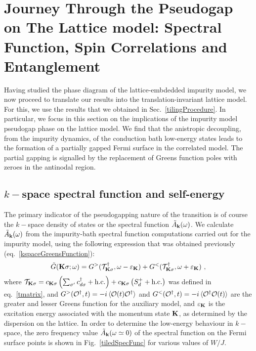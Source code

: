 \documentclass[reprint,hidelinks,onecolumn]{revtex4-2}
\begin{document}
\section{Journey Through the Pseudogap on The Lattice model: Spectral Function, Spin Correlations and Entanglement}
Having studied the phase diagram of the lattice-embdedded impurity model, we now proceed to translate our results into the translation-invariant lattice model. For this, we use the results that we obtained in Sec.~\ref{tilingProcedure}. In particular, we focus in this section on the implications of the impurity model pseudogap phase on the lattice model. We find that the anistropic decoupling, from the impurity dynamics, of the conduction bath low-energy states leads to the formation of a partially gapped Fermi surface in the correlated model. The partial gapping is signalled by the replacement of Greens function poles with zeroes in the antinodal region.

\subsection{\(k-\)space spectral function and self-energy}
The primary indicator of the pseudogapping nature of the transition is of course the \(k-\)space density of states or the spectral function \(\tilde A_{\bf k}(\omega)\). We calculate \(\tilde A_{\bf k}(\omega)\) from the impurity-bath spectral function computations carried out for the impurity model, using the following expression that was obtained previously (eq.~\ref{kspaceGreensFunction}):
\begin{equation}\begin{aligned}
	\tilde G({\bf K}\sigma; \omega) = G^>(\mathcal{T}^\dagger_{{\bf K}\sigma}, \omega - \varepsilon_{{\bf K}}) + G^<(\mathcal{T}^\dagger_{{\bf K}\sigma}, \omega + \varepsilon_{{\bf K}})~,
\end{aligned}\end{equation}
where \(\mathcal{T}_{{\bf K}\sigma} = c_{{\bf K}\sigma}\left(\sum_{\sigma^\prime}c^\dagger_{d\sigma} + \text{h.c.}\right) + c_{{\bf K}\sigma}\left(S_d^+ + \text{h.c.}\right)\) was defined in eq.~\ref{tmatrix}, and \(G^>(\mathcal{O}^\dagger, t) = -i\braket{\mathcal{O}(t)\mathcal{O}^\dagger}\) and \(G^<(\mathcal{O}^\dagger, t) = -i\braket{\mathcal{O}^\dagger\mathcal{O}(t)}\) are the greater and lesser Greens function for the auxiliary model, and \(\varepsilon_{{\bf K}}\) is the excitation energy associated with the momentum state \({\bf K}\), as determined by the dispersion on the lattice. In order to determine the low-energy behaviour in \(k-\)space, the zero frequency value \(\tilde A_{\bf k}(\omega \simeq 0)\) of the spectral function on the Fermi surface points is shown in Fig.~\ref{tiledSpecFunc} for various values of \(W/J\). 
\end{document}
